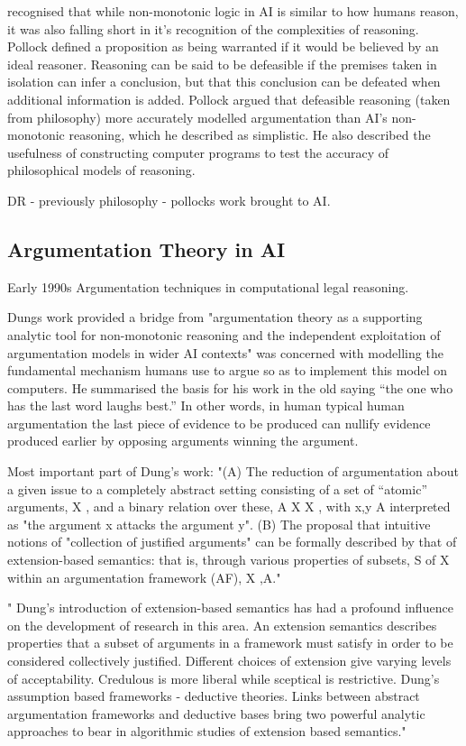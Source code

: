 \cite{pollock1987defeasible} recognised that while non-monotonic logic in AI is similar to how humans reason, it was also falling short in it’s recognition of the complexities of reasoning. Pollock defined a proposition as being warranted if it would be believed by an ideal reasoner. Reasoning can be said to be defeasible if the premises taken in isolation can infer a conclusion, but that this conclusion can be defeated when additional information is added. Pollock argued that defeasible reasoning (taken from philosophy) more accurately modelled argumentation than AI's non-monotonic reasoning, which he described as simplistic. He also described the usefulness of constructing computer programs to test the accuracy of philosophical models of reasoning.

DR - previously philosophy - pollocks work brought to AI.



\subsection{Argumentation Theory in AI}

Early 1990s Argumentation techniques in computational legal reasoning.



Dungs work provided a bridge from "argumentation theory as a supporting analytic
tool for non-monotonic reasoning and the independent exploitation of argumentation models in wider AI contexts"
\cite{dung1995acceptability} was concerned with modelling the fundamental mechanism humans use to argue so as to implement this model on computers. He summarised the basis for his work in the old saying “the one who has the last word laughs best.” In other words, in human typical human argumentation the last piece of evidence to be produced can nullify evidence produced earlier by opposing arguments winning the argument.

Most important part of Dung's work:
"(A) The reduction of argumentation about a given issue to a completely abstract setting consisting of a set of “atomic”
arguments, X , and a binary relation over these, A  X  X , with x,y  A interpreted as "the argument x
attacks the argument y".
(B) The proposal that intuitive notions of "collection of justified arguments" can be formally described by that of
extension-based semantics: that is, through various properties of subsets, S of X within an argumentation framework
(AF), X ,A."

"
Dung's introduction of extension-based semantics has had a profound influence on the development of research in this area.
An extension semantics describes properties that a subset of arguments in a framework must satisfy in order to be considered collectively justified.
Different choices of extension give varying levels of acceptability. Credulous is more liberal while sceptical is restrictive.
Dung's assumption based frameworks - deductive theories.
Links between abstract argumentation frameworks and deductive bases bring two powerful analytic approaches to bear in algorithmic studies of extension based semantics."

